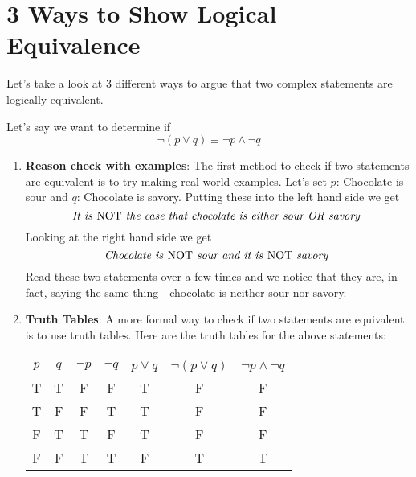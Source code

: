 \section{3 Ways to Show Logical Equivalence}
\label{sec:logicalEquivalence}

Let's take a look at 3 different ways to argue that two complex statements are logically equivalent.

Let's say we want to determine if $$\lnot (p \lor q) \equiv \lnot p \land \lnot q$$

\begin{enumerate}
    \item \textbf{Reason check with examples}: The first method to check if two statements are equivalent is to try making real world examples. Let's set $p$: Chocolate is sour and $q$: Chocolate is savory. Putting these into the left hand side we get
          $$\textit{It is \emph{NOT} the case that chocolate is either sour OR savory }$$
          Looking at the right hand side we get
          $$\textit{Chocolate is \emph{NOT} sour and it is \emph{NOT} savory }$$
          Read these two statements over a few times and we notice that they are, in fact, saying the same thing - chocolate is neither sour nor savory.
    \item \textbf{Truth Tables}: A more formal way to check if two statements are equivalent is to use truth tables. Here are the truth tables for the above statements:
          \begin{center}
              \begin{tabular}{|c|c|c|c|c|c|c|}
                  \hline
                  $p$ & $q$ & $\lnot p$ & $\lnot q$ & $p \lor q$ & $\lnot (p \lor q)$ & $\lnot p \land \lnot q$ \\
                  \hline
                  T   & T   & F         & F         & T          & F                  & F                       \\
                  \hline
                  T   & F   & F         & T         & T          & F                  & F                       \\
                  \hline
                  F   & T   & T         & F         & T          & F                  & F                       \\
                  \hline
                  F   & F   & T         & T         & F          & T                  & T                       \\
                  \hline
              \end{tabular}

\end{center}
\end{enumerate}
